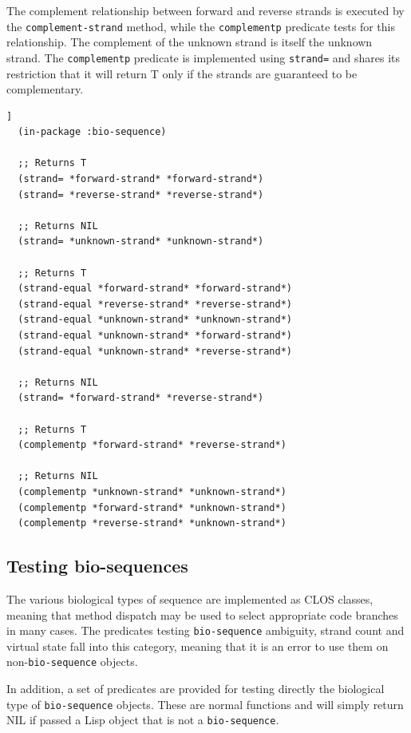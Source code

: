 \documentclass[a4paper, 12pt]{article}
\begin{document}
The complement relationship between forward and reverse strands is
executed by the \lstinline!complement-strand! method, while the
\lstinline!complementp! predicate tests for this relationship. The
complement of the unknown strand is itself the unknown strand. The
\lstinline!complementp! predicate is implemented using
\lstinline!strand=! and shares its restriction that it will return T
only if the strands are guaranteed to be complementary.

\begin{lstlisting}[caption={Sequence strand operations},
  label=lst:testing-bioseq,float=[tbph]]
  (in-package :bio-sequence)

  ;; Returns T
  (strand= *forward-strand* *forward-strand*)
  (strand= *reverse-strand* *reverse-strand*)

  ;; Returns NIL
  (strand= *unknown-strand* *unknown-strand*)
  
  ;; Returns T
  (strand-equal *forward-strand* *forward-strand*)
  (strand-equal *reverse-strand* *reverse-strand*)
  (strand-equal *unknown-strand* *unknown-strand*)
  (strand-equal *unknown-strand* *forward-strand*)
  (strand-equal *unknown-strand* *reverse-strand*)
  
  ;; Returns NIL
  (strand= *forward-strand* *reverse-strand*)
  
  ;; Returns T
  (complementp *forward-strand* *reverse-strand*)

  ;; Returns NIL
  (complementp *unknown-strand* *unknown-strand*)
  (complementp *forward-strand* *unknown-strand*)
  (complementp *reverse-strand* *unknown-strand*)
\end{lstlisting}


\subsection{Testing bio-sequences}

The various biological types of sequence are implemented as CLOS
classes, meaning that method dispatch may be used to select
appropriate code branches in many cases. The predicates testing
\lstinline!bio-sequence! ambiguity, strand count and virtual state
fall into this category, meaning that it is an error to use them on
non-\lstinline!bio-sequence! objects.

In addition, a set of predicates are provided for testing directly the
biological type of \lstinline!bio-sequence! objects. These are normal
functions and will simply return NIL if passed a Lisp object that is
not a \lstinline!bio-sequence!.
\end{document}

